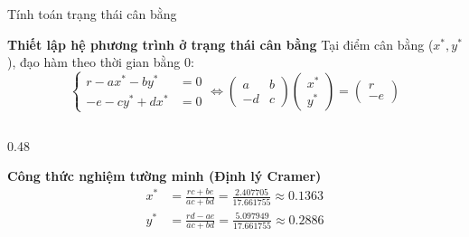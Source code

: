 \documentclass[aspectratio=169, 10pt]{beamer}
\renewcommand{\iff}{\ensuremath{\Leftrightarrow}}
\begin{document}
\begin{frame}{Tính toán trạng thái cân bằng }
  \begin{block}{\textbf{Thiết lập hệ phương trình ở trạng thái cân bằng}}
    \footnotesize
    Tại điểm cân bằng  ($x^*, y^*$), đạo hàm theo thời gian bằng 0:
    \begin{equation}
    \left\{
    \begin{aligned}
    r - ax^* - by^* &= 0 \\
    -e - cy^* + dx^* &= 0
    \end{aligned}
    \right.
    \iff
    \begin{pmatrix}
    a & b \\
    -d & c
    \end{pmatrix}
    \begin{pmatrix}
    x^* \\ y^*
    \end{pmatrix}
    =
    \begin{pmatrix}
    r \\ -e
    \end{pmatrix}
    \end{equation}
  \end{block}

  \vspace{0.1cm}

  \begin{columns}[c]
    \begin{column}{0.48\textwidth}
      \begin{exampleblock}{\textbf{Công thức nghiệm tường minh (Định lý Cramer)}}
        \footnotesize
        \begin{align}
        x^* &= \frac{rc + be}{ac + bd} = \frac{2.407705}{17.661755} \approx \mathbf{0.1363} \\
        y^* &= \frac{rd - ae}{ac + bd} = \frac{5.097949}{17.661755} \approx \mathbf{0.2886}
        \end{align}
      \end{exampleblock}
    \end{column}


\end{columns}
\end{frame}
\end{document}
